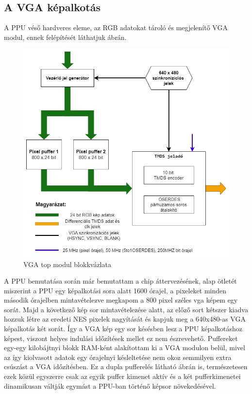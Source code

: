 	\subsection{A VGA képalkotás}
	
	A PPU véső hardveres eleme, az RGB adatokat tároló és megjelenítő VGA modul, ennek felépítését láthatjuk  ábrán. 
	
	\begin{figure}[H]
		\centering
		\includegraphics[width=120mm, keepaspectratio]{figures/vga-top-diagram}
		\caption{VGA top modul blokkvázlata} 
		\label{fig:vga-rendering-top}
	\end{figure} 

	A PPU bemutatása során  már bemutattam a chip áttervezésének, alap ötletét miszerint a PPU egy képalkotási sora alatt 1600 órajel, a pixeleket minden második órajelben mintavételezve megkapom a 800 pixel széles vga képem egy sorát. Majd a következő kép sor mintavételezése alatt, az előző sort kétszer kiadva hozzuk létre az eredeti NES pixelek nagyítását és kapjuk meg a 640x480-as VGA képalkotás két sorát. Így a VGA kép egy sor késésben lesz a PPU képalkotáshoz képest, viszont helyes indulási időzítések mellet ez nem észrevehető. Puffereket egy-egy kilobájtnyi blokk RAM-ként alakítottam ki a VGA modulon belül, mivel az így kiolvasott adatok egy órajelnyi késleltetése nem okoz semmilyen extra csúszást a VGA időzítésben. Ez a dupla pufferelés látható  ábrán is, természetesen ezek közül egyszerre csak az egyik puffer kimenet aktív és a két pufferkimenetei dinamikusan váltják egymást a PPU-ban történő képsor növekedésével.
	
